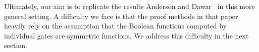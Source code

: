 \documentclass[../paper.tex]{subfiles}
\begin{document}
Ultimately, our aim is to replicate the results Anderson and
Dawar~\cite{AndersonD17} in this more general setting. A difficulty we face is
that the proof methods in that paper heavily rely on the assumption that the
Boolean functions computed by individual gates are symmetric functions. We
address this difficulty in the next section.




\end{document}
